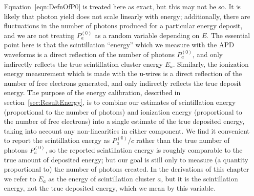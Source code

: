 Equation~\ref{eqn:DefnOfP0} is treated here as exact, but this may not be so.  It is likely that photon yield does not scale linearly with energy; additionally, there are fluctuations in the number of photons produced for a particular energy deposit, and we are not treating $P^{(0)}_a$ as a random variable depending on $E$.  The essential point here is that the scintillation ``energy'' which we measure with the APD waveforms is a direct reflection of the number of photons $P^{(0)}_a$, and only indirectly reflects the true scintillation cluster energy $E_a$.  Similarly, the ionization energy measurement which is made with the u-wires is a direct reflection of the number of free electrons generated, and only indirectly reflects the true deposit energy.  The purpose of the energy calibration, described in section~\ref{sec:ResultEnergy}, is to combine our estimates of scintillation energy (proportional to the number of photons) and ionization energy (proportional to the number of free electrons) into a single estimate of the true deposited energy, taking into account any non-linearities in either component.  We find it convenient to report the scintillation energy as $P^{(0)}_a/c$ rather than the true number of photons $P^{(0)}_a$, so the reported scintillation energy is roughly comparable to the true amount of deposited energy; but our goal is still only to measure (a quantity proportional to) the number of photons created.  In the derivations of this chapter we refer to $E_a$ as the energy of scintillation cluster $a$, but it is the scintillation energy, not the true deposited energy, which we mean by this variable.

